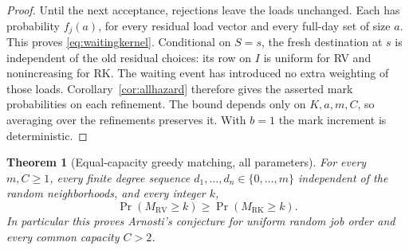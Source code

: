 \documentclass[11pt]{article}
\newtheorem{theorem}{Theorem}
\newcommand{\RV}{\mathrm{RV}}
\newcommand{\RK}{\mathrm{RK}}
\begin{document}
\begin{proof}
Until the next acceptance, rejections leave the loads unchanged.
Each has probability $f_j(a)$, for every residual load vector and
every full-day set of size $a$. This proves
\eqref{eq:waitingkernel}. Conditional on $S=s$, the fresh destination
at $s$ is independent of the old residual choices: its row on $I$
is uniform for RV and nonincreasing for RK. The waiting event has
introduced no extra weighting of those loads. Corollary~\ref{cor:allhazard}
therefore gives the asserted mark probabilities on each refinement.
The bound depends only on $K,a,m,C$, so averaging over the refinements
preserves it. With $b=1$ the mark increment is deterministic.
\end{proof}

\begin{theorem}[Equal-capacity greedy matching, all parameters]\label{thm:fullconjecture}
For every $m,C\geq1$, every finite degree sequence
$d_1,\ldots,d_n\in\{0,\ldots,m\}$ independent of the random
neighborhoods, and every integer $k$,
\[
 \Pr(M_\RV\geq k)\geq\Pr(M_\RK\geq k).
\]
In particular this proves Arnosti's conjecture for uniform random
job order and every common capacity $C>2$.
\end{theorem}
\end{document}
